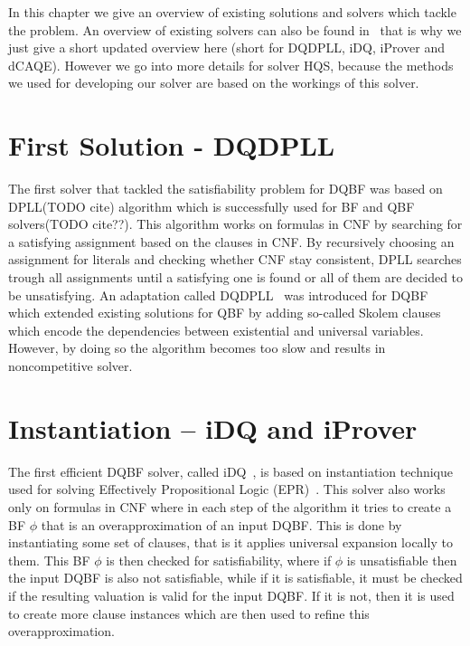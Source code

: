 \documentclass[
  digital, %
  twoside, %
  table,   %
  nolof,     %
  nolot,     %
]{fithesis3}
\theoremstyle{definition}
\theoremstyle{remark}
\begin{document}
In this chapter we give an overview of existing solutions and solvers which tackle the problem. An overview of existing solvers can also be found in~\cite{DQBFStateOfArtTalk,DQBFStateOfArt,DQBFStateOfArtNew} that is why we just give a short updated overview here (short for DQDPLL, iDQ, iProver and dCAQE). However we go into more details for solver HQS, because the methods we used for developing our solver are based on the workings of this solver.



\section{First Solution - DQDPLL}
The first solver that tackled the satisfiability problem for DQBF was based on DPLL(TODO cite) algorithm which is successfully used for BF and QBF solvers(TODO cite??). This algorithm works on formulas in CNF by searching for a satisfying assignment based on the clauses in CNF. By recursively choosing an assignment for literals and checking whether CNF stay consistent, DPLL searches trough all assignments until a satisfying one is found or all of them are decided to be unsatisfying. An adaptation called DQDPLL~\cite{DPLLalgorithm} was introduced for DQBF which extended existing solutions for QBF by adding so-called Skolem clauses which encode the dependencies between existential and universal variables. However, by doing so the algorithm becomes too slow and results in noncompetitive solver.

\section{Instantiation -- iDQ and iProver}
The first efficient DQBF solver, called iDQ~\cite{iDQandDQDIMACS}, is based on instantiation technique used for solving Effectively Propositional Logic (EPR)~\cite{iProver}. This solver also works only on formulas in CNF where in each step of the algorithm it tries to create a BF $\phi$ that is an overapproximation of an input DQBF. This is done by instantiating some set of clauses, that is it applies universal expansion locally to them. This BF $\phi$ is then checked for satisfiability, where if $\phi$ is unsatisfiable then the input DQBF is also not satisfiable, while if it is satisfiable, it must be checked if the resulting valuation is valid for the input DQBF. If it is not, then it is used to create more clause instances which are then used to refine this overapproximation.
\end{document}
